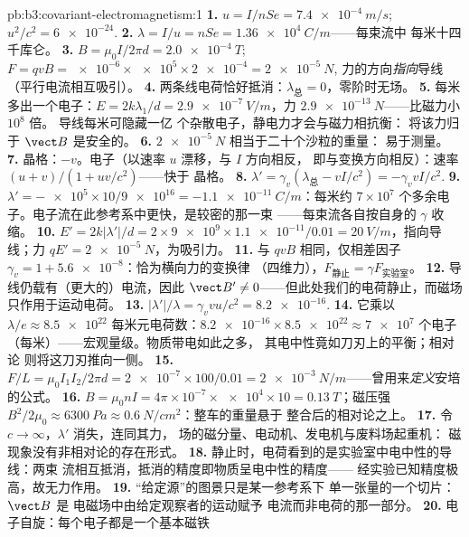 \begin{solution}{pb:b3:covariant-electromagnetism:1}
\textbf{1.} $u = I/nSe = \qty{7.4e-4}{m/s}$; $u^2/c^2 =
\num{6e-24}$.
\textbf{2.} $\lambda = I/u = nSe = \qty{1.36e4}{C/m}$——每束流中
每米十四千库仑。
\textbf{3.} $B = \mu_0I/2\pi d = \qty{2.0e-4}{T}$; $F = qvB =
\num{e-6} \times \num{e5} \times \num{2e-4} = \qty{2e-5}{N}$,
力的方向\emph{指向}导线（平行电流相互吸引）。
\textbf{4.} 两条线电荷恰好抵消：$\lambda_{\text{总}}
= 0$，零阶时无场。
\textbf{5.} 每米多出一个电子：$E = 2k\lambda_1/d =
\qty{2.9e-7}{V/m}$，力 $\qty{2.9e-13}{N}$——比磁力小 $10^8$ 倍。
导线每米可隐藏一亿
个杂散电子，静电力才会与磁力相抗衡：
将该力归于 $\vect B$ 是安全的。
\textbf{6.} $\qty{2e-5}{N}$ 相当于二十个沙粒的重量：
易于测量。
\textbf{7.} 晶格：$-v$。电子（以速率 $u$ 漂移，与 $I$ 方向相反，
即与变换方向相反）：速率 $(u + v)/(1 + uv/c^2)$——快于
晶格。
\textbf{8.} $\lambda' = \gamma_v(\lambda_{\text{总}} - vI/c^2) =
-\gamma_v vI/c^2$.
\textbf{9.} $\lambda' = -\num{e5} \times 10/\num{9e16} =
\qty{-1.1e-11}{C/m}$：每米约
$7 \times 10^7$ 个多余电子。电子流在此参考系中更快，是较密的那一束
——每束流各自按自身的 $\gamma$ 收缩。
\textbf{10.} $E' = 2k|\lambda'|/d = 2 \times \num{9e9} \times
\num{1.1e-11}/0.01 = \qty{20}{V/m}$，指向导线；力
$qE' = \qty{2e-5}{N}$，为吸引力。
\textbf{11.} 与 $qvB$ 相同，仅相差因子 $\gamma_v = 1 +
\num{5.6e-8}$：恰为横向力的变换律
（四维力），$F_{\text{静止}} = \gamma F_{\text{实验室}}$。
\textbf{12.} 导线仍载有（更大的）电流，因此 $\vect
B' \neq 0$——但此处我们的电荷静止，而磁场
只作用于运动电荷。
\textbf{13.} $|\lambda'|/\lambda = \gamma_v vu/c^2 = \num{8.2e-16}$.
\textbf{14.} 它乘以 $\lambda/e \approx \num{8.5e22}$
每米元电荷数：$\num{8.2e-16} \times \num{8.5e22}
\approx \num{7e7}$ 个电子（每米）——宏观量级。物质带电如此之多，
其电中性竟如刀刃上的平衡；相对论
则将这刀刃推向一侧。
\textbf{15.} $F/L = \mu_0I_1I_2/2\pi d = \num{2e-7} \times 100/0.01 =
\qty{2e-3}{N/m}$——曾用来\emph{定义}安培的公式。
\textbf{16.} $B = \mu_0nI = 4\pi\times10^{-7} \times \num{e4} \times
10 = \qty{0.13}{T}$；磁压强 $B^2/2\mu_0 \approx
\qty{6300}{Pa} \approx \qty{0.6}{N/cm^2}$：整车的重量悬于
整合后的相对论之上。
\textbf{17.} 令 $c \to \infty$，$\lambda'$ 消失，连同其力，
场的磁分量、电动机、发电机与废料场起重机：
磁现象没有非相对论的存在形式。
\textbf{18.} 静止时，电荷看到的是实验室中电中性的导线：两束
流相互抵消，抵消的精度即物质呈电中性的精度——
经实验已知精度极高，故无力作用。
\textbf{19.} “给定源”的图景只是某一参考系下
单一张量的一个切片：$\vect B$ 是
电磁场中由给定观察者的运动赋予
电流而非电荷的那一部分。
\textbf{20.} 电子自旋：每个电子都是一个基本磁铁

\end{solution}
